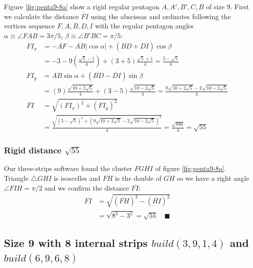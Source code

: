 \documentclass[11pt]{article}
\begin{document}
Figure \ref{fig:penta9-8a} show a rigid regular pentagon $A,A',B',C,B$ of size $9$. First we calculate the distance $\overline{FI}$ using the abscissas and ordinates following the vertices sequence $F,A,B,D,I$ with the regular pentagon angles $\alpha \equiv \angle{FAB} = 3\pi/5$, $\beta \equiv \angle{B'BC} = \pi/5$:
\begin{align}
FI_x &= -\overline{AF} - \overline{AB}|\cos\alpha| + (\overline{BD} + \overline{DI})\cos\beta\nonumber\\
 &= -3 - 9\left(\frac{\sqrt5-1}4\right) + (3+5)\frac{\sqrt5+1}4 = \frac{5-\sqrt5}4\\
FI_y &= \overline{AB}\sin\alpha + (\overline{BD}-\overline{DI})\sin\beta\nonumber\\
 &= (9)\frac{\sqrt{10+2\sqrt5}}4 + (3-5)\frac{\sqrt{10-2\sqrt5}}4
 = \frac{9\sqrt{10+2\sqrt5} - 2\sqrt{10-2\sqrt5}}4\\
\overline{FI} &= \sqrt{(FI_x)^2 + (FI_y)^2}\nonumber\\
 &= \frac{\sqrt{(5-\sqrt5)^2 + (9\sqrt{10+2\sqrt5} - 2\sqrt{10-2\sqrt5})^2}}4
 = \frac{\sqrt{880}}4 = \sqrt{55}
\end{align}

\subsubsection{Rigid distance $\sqrt{55}$}

Our three-strips software found the cluster $FGHI$ of figure \ref{fig:penta9-8a}. Triangle $\triangle{GHI}$ is isoscelles and $\overline{FH}$ is the double of $\overline{GH}$ so we have a right angle $\angle{FIH} = \pi/2$ and we confirm the distance $\overline{FI}$:
\begin{align}
\overline{FI} &= \sqrt{(\overline{FH})^2 - (\overline{HI})^2}\nonumber\\
 &= \sqrt{8^2 - 3^2} = \sqrt{55} \quad\blacksquare
\end{align}

\subsection{Size 9 with 8 internal strips $build(3,9,1,4)$ and $build(6,9,6,8)$}
\end{document}
